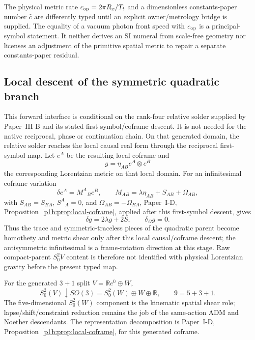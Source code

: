 \documentclass[12pt,a4paper]{article}
\begin{document}
\begin{remark}
\label{p3a:rem:v185-constants-speed-firewall}
The physical metric rate $c_{\rm op}=2\pi R_x/T_t$ and a dimensionless
constants-paper number $\widehat c$ are differently typed until an explicit
owner/metrology bridge is supplied.  The equality of a vacuum photon front
speed with $c_{\rm op}$ is a principal-symbol statement.  It neither derives
an SI numeral from scale-free geometry nor licenses an adjustment of the
primitive spatial metric to repair a separate constants-paper residual.
\end{remark}



\subsection{Local descent of the symmetric quadratic branch}
\label{p3a:sec:v189-local-symmetric-quadratic-descent}
This forward interface is conditional on the rank-four relative solder
supplied by Paper~III-B and its stated first-symbol/coframe descent. It is
not needed for the native reciprocal, phase or continuation chain. On that
generated domain, the relative solder reaches the local causal real form
through the reciprocal first-symbol map.  Let $e^A$
be the resulting local coframe and
\[
 g=\eta_{AB}e^A\otimes e^B
\]
the corresponding Lorentzian metric on that local domain.  For an
infinitesimal coframe variation
\[
 \delta e^A=M^A{}_B e^B,
 \qquad
 M_{AB}=\lambda\eta_{AB}+S_{AB}+\Omega_{AB},
\]
with $S_{AB}=S_{BA}$, $S^A{}_A=0$, and
$\Omega_{AB}=-\Omega_{BA}$, Paper~I-D,
Proposition~\ref{p1b:prop:local-coframe}, applied after this first-symbol
descent, gives
\[
 \boxed{\delta g=2\lambda g+2S,\qquad \delta_\Omega g=0.}
\]
Thus the trace and symmetric-traceless pieces of the quadratic parent become
homothety and metric shear only after this local causal/coframe descent; the
antisymmetric infinitesimal is a frame-rotation direction at this stage.
Raw compact-parent $S^2_0V$ content is therefore not identified with physical
Lorentzian gravity before the present typed map.

\begin{corollary}
\label{p3a:cor:v189-spatial-shear-decomposition}
For the generated $3+1$ split $V=\mathbb Re^0\oplus W$,
\[
 \boxed{S^2_0(V)\downarrow SO(3)
 =S^2_0(W)\oplus W\oplus\mathbb R,}
 \qquad 9=5+3+1.
\]
The five-dimensional $S^2_0(W)$ component is the kinematic spatial shear
role; lapse/shift/constraint reduction remains the job of the same-action ADM
and Noether descendants.
The representation decomposition is Paper~I-D,
Proposition~\ref{p1b:prop:local-coframe}, for this generated coframe.
\end{corollary}
\end{document}
